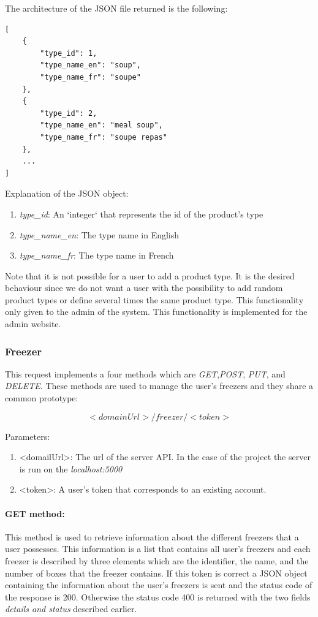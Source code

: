 The architecture of the JSON file returned is the following:
\begin{lstlisting}
[
    {
        "type_id": 1,
        "type_name_en": "soup",
        "type_name_fr": "soupe"
    },
    {
        "type_id": 2,
        "type_name_en": "meal soup",
        "type_name_fr": "soupe repas"
    },
    ...
]
\end{lstlisting}

Explanation of the  JSON object:
\begin{enumerate}
\item \textit{type\_id}: An `integer` that represents the id of the product's type
\item \textit{type\_name\_en}: The type name in English
\item \textit{type\_name\_fr}: The type name in French
\end{enumerate}

Note that it is not possible for a user to add a product type. It is the desired behaviour since we do not want a user with the possibility to add random product types or define several times the same product type. This functionality only given to the admin of the system. This functionality is implemented for the admin website.

\subsubsection{Freezer}
This request implements a four methods which are \textit{GET},\textit{POST}, \textit{PUT}, and \textit{DELETE}. These methods are used to manage the user's freezers and they share a common prototype:

$$<domainUrl>/freezer/<token>$$

Parameters:
\begin{enumerate}
\item <domailUrl>: The url of the server API. In the case of the project the server is run on the \textit{localhost:5000}
\item <token>: A user's token that corresponds to an existing account.
\end{enumerate}

\paragraph{GET method:} This method is used to retrieve information about the different freezers that a user possesses. This information is a list that contains all user's freezers and each freezer is described by three elements which are the identifier, the name, and the number of boxes that the freezer contains. If this token is correct a JSON object containing the information about the user's freezers is sent and the status code of the response is 200. Otherwise the status code 400 is returned with the two fields \textit{details and status} described earlier.\\


